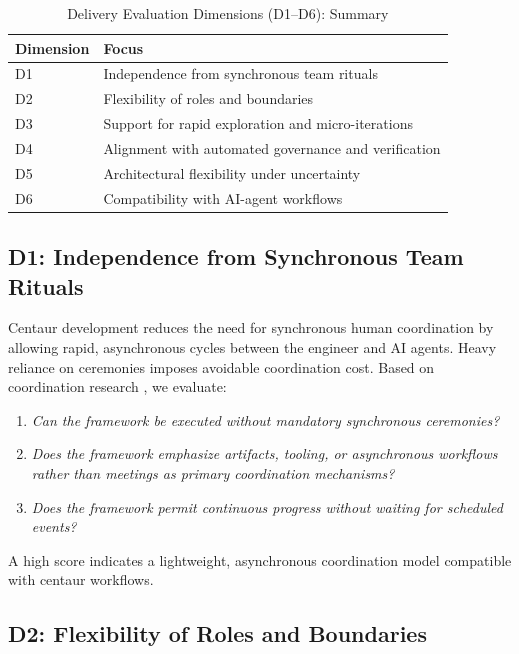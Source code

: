 \documentclass[11pt, a4paper, twocolumn]{article} %
\begin{document}
\begin{table}[h]
\centering
\caption{Delivery Evaluation Dimensions (D1--D6): Summary}
\label{tab:delivery-dimension-summary}
\begin{tabular}{ll}
\toprule
\textbf{Dimension} & \textbf{Focus} \\
\midrule
D1 & Independence from synchronous team rituals \\
D2 & Flexibility of roles and boundaries \\
D3 & Support for rapid exploration and micro-iterations \\
D4 & Alignment with automated governance and verification \\
D5 & Architectural flexibility under uncertainty \\
D6 & Compatibility with AI-agent workflows \\
\bottomrule
\end{tabular}
\end{table}

\newpage

\subsection*{D1: Independence from Synchronous Team Rituals}

Centaur development reduces the need for synchronous human coordination by
allowing rapid, asynchronous cycles between the engineer and AI agents. Heavy
reliance on ceremonies imposes avoidable coordination cost. Based on coordination
research \citep{cockburn2001,schwaber2017scrum}, we evaluate:

\begin{enumerate}[label=D1.\arabic*), leftmargin=*]
    \item \emph{Can the framework be executed without mandatory synchronous
    ceremonies?}
    \item \emph{Does the framework emphasize artifacts, tooling, or
    asynchronous workflows rather than meetings as primary coordination
    mechanisms?}
    \item \emph{Does the framework permit continuous progress without waiting
    for scheduled events?}
\end{enumerate}

A high score indicates a lightweight, asynchronous coordination model compatible
with centaur workflows.

\subsection*{D2: Flexibility of Roles and Boundaries}
\end{document}
